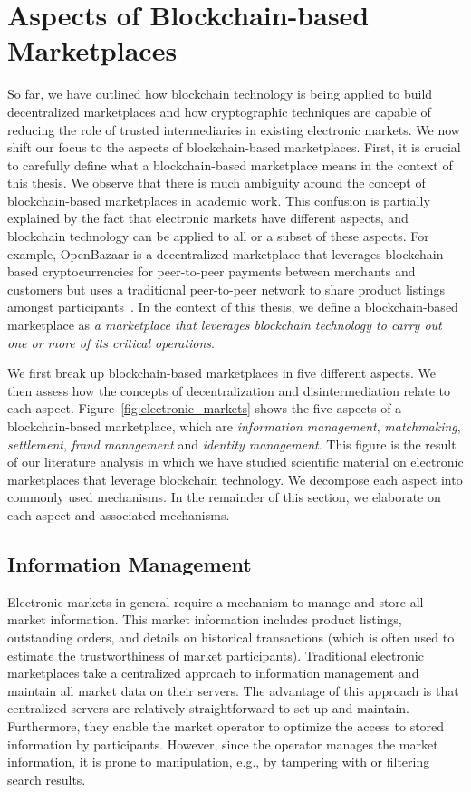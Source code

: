 \section{Aspects of Blockchain-based Marketplaces}
So far, we have outlined how blockchain technology is being applied to build decentralized marketplaces and how cryptographic techniques are capable of reducing the role of trusted intermediaries in existing electronic markets.
We now shift our focus to the aspects of blockchain-based marketplaces.
First, it is crucial to carefully define what a blockchain-based marketplace means in the context of this thesis.
We observe that there is much ambiguity around the concept of blockchain-based marketplaces in academic work.
This confusion is partially explained by the fact that electronic markets have different aspects, and blockchain technology can be applied to all or a subset of these aspects.
For example, OpenBazaar is a decentralized marketplace that leverages blockchain-based cryptocurrencies for peer-to-peer payments between merchants and customers but uses a traditional peer-to-peer network to share product listings amongst participants~\cite{openbazaar}.
In the context of this thesis, we define a blockchain-based marketplace as \emph{a marketplace that leverages blockchain technology to carry out one or more of its critical operations}.

We first break up blockchain-based marketplaces in five different aspects.
We then assess how the concepts of decentralization and disintermediation relate to each aspect.
Figure~\ref{fig:electronic_markets} shows the five aspects of a blockchain-based marketplace, which are \emph{information management}, \emph{matchmaking}, \emph{settlement}, \emph{fraud management} and \emph{identity management}.
This figure is the result of our literature analysis in which we have studied scientific material on electronic marketplaces that leverage blockchain technology.
We decompose each aspect into commonly used mechanisms.
In the remainder of this section, we elaborate on each aspect and associated mechanisms.

\subsection{Information Management}
Electronic markets in general require a mechanism to manage and store all market information.
This market information includes product listings, outstanding orders, and details on historical transactions (which is often used to estimate the trustworthiness of market participants).
Traditional electronic marketplaces take a centralized approach to information management and maintain all market data on their servers.
The advantage of this approach is that centralized servers are relatively straightforward to set up and maintain.
Furthermore, they enable the market operator to optimize the access to stored information by participants.
However, since the operator manages the market information, it is prone to manipulation, e.g., by tampering with or filtering search results.

